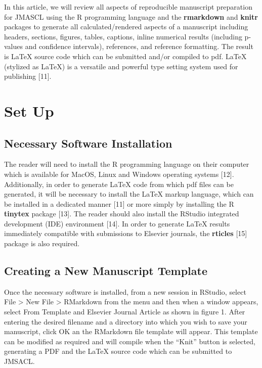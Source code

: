 \documentclass[]{elsarticle} %
\begin{document}
In this article, we will review all aspects of reproducible manuscript
preparation for JMASCL using the R programming language and the
\textbf{rmarkdown} and \textbf{knitr} packages to generate all
calculated/rendered aspects of a manuscript including headers, sections,
figures, tables, captions, inline numerical results (including p-values
and confidence intervals), references, and reference formatting. The
result is LaTeX source code which can be submitted and/or compiled to
pdf. LaTeX (stylized as \LaTeX) is a versatile and powerful type setting
system used for publishing {[}11{]}.

\hypertarget{set-up}{%
\section{Set Up}\label{set-up}}

\hypertarget{necessary-software-installation}{%
\subsection{Necessary Software
Installation}\label{necessary-software-installation}}

The reader will need to install the R programming language on their
computer which is available for MacOS, Linux and Windows operating
systems {[}12{]}. Additionally, in order to generate LaTeX code from
which pdf files can be generated, it will be necessary to install the
LaTeX markup language, which can be installed in a dedicated manner
{[}11{]} or more simply by installing the R \textbf{tinytex} package
{[}13{]}. The reader should also install the RStudio integrated
development (IDE) environment {[}14{]}. In order to generate LaTeX
results immediately compatible with submissions to Elsevier journals,
the \textbf{rticles} {[}15{]} package is also required.

\hypertarget{creating-a-new-manuscript-template}{%
\subsection{Creating a New Manuscript
Template}\label{creating-a-new-manuscript-template}}

Once the necessary software is installed, from a new session in RStudio,
select File \textgreater{} New File \textgreater{} RMarkdown from the
menu and then when a window appears, select From Template and Elsevier
Journal Article as shown in figure 1. After entering the desired
filename and a directory into which you wish to save your manuscript,
click OK an the RMarkdown file template will appear. This template can
be modified as required and will compile when the ``Knit'' button is
selected, generating a PDF and the LaTeX source code which can be
submitted to JMSACL.
\end{document}
